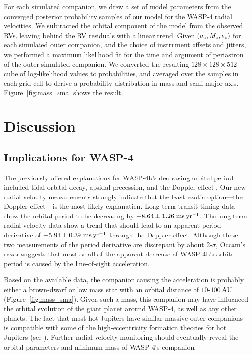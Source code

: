 \documentclass[12pt,twocolumn,tighten]{aastex62}
\begin{document}
For each simulated companion, we drew a set of model parameters from
the converged posterior probability samples of our model for the
WASP-4 radial velocities.  We subtracted the orbital component of the
model from the observed RVs, leaving behind the RV residuals with a
linear trend.  Given $(a_{\rm c}, M_{\rm c}, e_{\rm c})$ for each
simulated outer companion, and the choice of instrument offsets and
jitters, we performed a maximum likelihood fit for the time and
argument of periastron of the outer simulated companion.  We converted
the resulting $128\times128\times512$ cube of log-likelihood values to
probabilities, and averaged over the samples in each grid cell to
derive a probability distribution in mass and semi-major axis.
Figure~\ref{fig:mass_sma} shows the result.

\section{Discussion}
\label{sec:discussion}

\subsection{Implications for WASP-4}

The previously offered explanations for WASP-4b's decreasing orbital
period included tidal orbital decay, apsidal precession, and the
Doppler effect \citep{bouma_wasp4b_2019}.  Our new radial velocity
measurements strongly indicate that the least exotic option---the
Doppler effect---is the most likely explanation.  Long-term transit
timing data show the orbital period to be decreasing by $- 8.64 \pm
1.26~{\rm ms}\,{\rm yr}^{-1}$.  The long-term radial velocity data
show a trend that should lead to an apparent period derivative of
$-5.94 \pm 0.39~{\rm ms}\,{\rm yr}^{-1}$ through the Doppler effect.
Although these two measurements of the period derivative are
discrepant by about 2-$\sigma$, Occam's razor suggests that most or
all of the apparent decrease of WASP-4b's orbital period is caused by
the line-of-sight acceleration.

Based on the available data, the companion causing the acceleration is
probably either a brown-dwarf or low mass star with an orbital
distance of $10$-$100\,{\rm AU}$ (Figure~\ref{fig:mass_sma}).  Given
such a mass, this companion may have influenced the orbital evolution
of the giant planet around WASP-4, as well as any other planets.  The
fact that most hot Jupiters have similar massive outer companions
\citep{knutson_friends_2014,bryan_statistics_2016} is compatible with
some of the high-eccentricity formation theories for hot Jupiters (see
\citealt{dawson_johnson_2018}).  Further radial velocity monitoring
should eventually reveal the orbital parameters and minimum mass of
WASP-4's companion.
\end{document}
